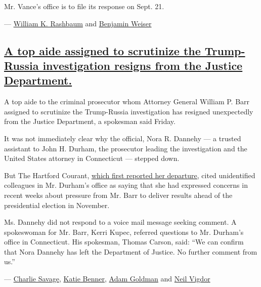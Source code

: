 Mr. Vance's office is to file its response on Sept. 21.

---
\href{https://www.nytimes3xbfgragh.onion/by/william-k-rashbaum}{William
K. Rashbaum} and
\href{https://www.nytimes3xbfgragh.onion/by/benjamin-weiser}{Benjamin
Weiser}

\hypertarget{a-top-aide-assigned-to-scrutinize-the-trump-russia-investigation-resigns-from-the-justice-department}{%
\subsection{\texorpdfstring{\protect\hyperlink{a-top-aide-assigned-to-scrutinize-the-trump-russia-investigation-resigns-from-the-justice-department}{A
top aide assigned to scrutinize the Trump-Russia investigation resigns
from the Justice
Department.}}{A top aide assigned to scrutinize the Trump-Russia investigation resigns from the Justice Department.}}\label{a-top-aide-assigned-to-scrutinize-the-trump-russia-investigation-resigns-from-the-justice-department}}

A top aide to the criminal prosecutor whom Attorney General William P.
Barr assigned to scrutinize the Trump-Russia investigation has resigned
unexpectedly from the Justice Department, a spokesman said Friday.

It was not immediately clear why the official, Nora R. Dannehy --- a
trusted assistant to John H. Durham, the prosecutor leading the
investigation and the United States attorney in Connecticut --- stepped
down.

But The Hartford Courant,
\href{https://www.courant.com/news/connecticut/hc-news-john-durham-dannehy-resignation-20200911-20200911-xcsapnq7g5e63kvtw5aqi7cv34-story.html}{which
first reported her departure,} cited unidentified colleagues in Mr.
Durham's office as saying that she had expressed concerns in recent
weeks about pressure from Mr. Barr to deliver results ahead of the
presidential election in November.

Ms. Dannehy did not respond to a voice mail message seeking comment. A
spokeswoman for Mr. Barr, Kerri Kupec, referred questions to Mr.
Durham's office in Connecticut. His spokesman, Thomas Carson, said: ``We
can confirm that Nora Dannehy has left the Department of Justice. No
further comment from us.''

--- \href{https://www.nytimes3xbfgragh.onion/by/charlie-savage}{Charlie
Savage}, \href{https://www.nytimes3xbfgragh.onion/by/katie-benner}{Katie
Benner}, \href{https://www.nytimes3xbfgragh.onion/by/adam-goldman}{Adam
Goldman} and
\href{https://www.nytimes3xbfgragh.onion/by/neil-vigdor}{Neil Vigdor}

